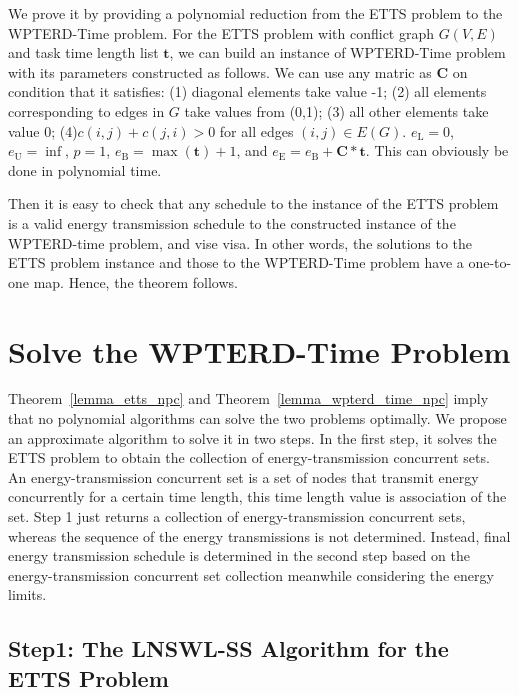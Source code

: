 \documentclass[journal,10pt]{IEEEtran}
\begin{document}
\begin{IEEEproof}
We prove it by providing a polynomial reduction from the ETTS problem to the WPTERD-Time problem. For the ETTS problem with conflict graph $G(V,E)$ and task time length list $\mathbf{t}$, we can build an instance of WPTERD-Time problem with its parameters constructed as follows. We can use any matric as $\mathbf{C}$ on condition that it satisfies: (1) diagonal elements take value -1; (2) all elements corresponding to edges in $G$ take values from (0,1); (3) all other elements take value 0; (4)$c(i,j){+}c(j,i){>}0$ for all edges $(i,j){\in}E(G)$. $e_\text{L}{=}0$, $e_\text{U}{=}\inf$, $p{=}1$, $e_\text{B}{=}\max(\mathbf{t}){+}1$, and $e_\text{E}{=}e_\text{B}{+}\mathbf{C}{*}\mathbf{t}$. This can obviously be done in polynomial time.

Then it is easy to check that any schedule to the instance of the ETTS problem is a valid energy transmission schedule to the constructed instance of the WPTERD-time problem, and vise visa. In other words, the solutions to the ETTS problem instance and those to the WPTERD-Time problem have a one-to-one map. Hence, the theorem follows.
\end{IEEEproof}

\section{Solve the WPTERD-Time Problem}
\label{sec_solve_wpter_time}

Theorem~\ref{lemma_etts_npc} and Theorem~\ref{lemma_wpterd_time_npc} imply that no polynomial algorithms can solve the two problems optimally. We propose an approximate algorithm to solve it in two steps. In the first step, it solves the ETTS problem to obtain the collection of energy-transmission concurrent sets. An energy-transmission concurrent set is a set of nodes that transmit energy concurrently for a certain time length, this time length value is association of the set. Step 1 just returns a collection of energy-transmission concurrent sets, whereas the sequence of the energy transmissions is not determined. Instead, final energy transmission schedule is determined in the second step based on the energy-transmission concurrent set collection meanwhile considering the energy limits.

\subsection{Step1: The LNSWL-SS Algorithm for the ETTS Problem}
\end{document}
